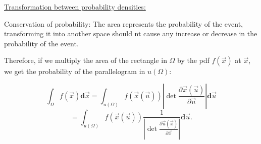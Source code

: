 \underline{Transformation between probability densities:}

Conservation of probability: The area represents the probability of the event, 
transforming it into another space should nt cause any increase or decrease in the probability of the event.

Therefore, if we multiply the area of the rectangle in $\Omega$ by the pdf $f(\vec x)$ at $\vec x$, we get the probability of the parallelogram in $u(\Omega)$:

$$
\int_{\Omega} f(\vec{x}) \mathbf{d}\vec{x}
=\int_{u(\Omega)} f({\vec x(\vec u)}) \left|\det \frac{\partial \vec{x}(\vec{u})}{\partial \vec{u}} \right| \mathbf{d}\vec{u}
$$
$$
=\int_{u(\Omega)} f({\vec x(\vec u)}) \frac{1}{\left|\det \frac{\partial \vec{u}(\vec{x})}{\partial \vec{x}} \right|} \mathbf{d}\vec{u}.
$$

